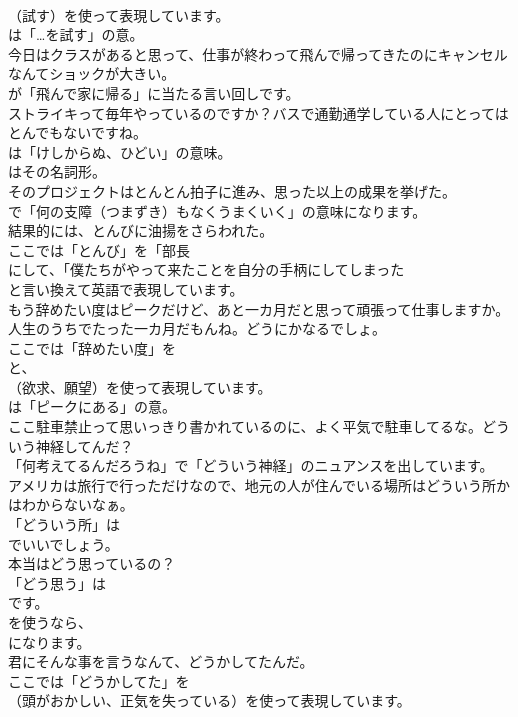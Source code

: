 \documentclass[8pt]{extreport}
\begin{document}
\begin{CJK}{UTF8}{min}
\\	（試す）を使って表現しています。
\\	は「…を試す」の意。	
\\	今日はクラスがあると思って、仕事が終わって飛んで帰ってきたのにキャンセルなんてショックが大きい。 
\\	が「飛んで家に帰る」に当たる言い回しです。	
\\	ストライキって毎年やっているのですか？バスで通勤通学している人にとってはとんでもないですね。 
\\	は「けしからぬ、ひどい」の意味。
\\	はその名詞形。	
\\	そのプロジェクトはとんとん拍子に進み、思った以上の成果を挙げた。 
\\	で「何の支障（つまずき）もなくうまくいく」の意味になります。	
\\	結果的には、とんびに油揚をさらわれた。 
\\	ここでは「とんび」を「部長
\\	にして、「僕たちがやって来たことを自分の手柄にしてしまった
\\	と言い換えて英語で表現しています。	
\\	もう辞めたい度はピークだけど、あと一カ月だと思って頑張って仕事しますか。人生のうちでたった一カ月だもんね。どうにかなるでしょ。 
\\	ここでは「辞めたい度」を 
\\	と、
\\	（欲求、願望）を使って表現しています。
\\	は「ピークにある」の意。	
\\	ここ駐車禁止って思いっきり書かれているのに、よく平気で駐車してるな。どういう神経してんだ？ 
\\	「何考えてるんだろうね」で「どういう神経」のニュアンスを出しています。	
\\	アメリカは旅行で行っただけなので、地元の人が住んでいる場所はどういう所かはわからないなぁ。 
\\	「どういう所」は 
\\	でいいでしょう。	
\\	本当はどう思っているの？ 
\\	「どう思う」は
\\	です。
\\	を使うなら、
\\	になります。	
\\	君にそんな事を言うなんて、どうかしてたんだ。 
\\	ここでは「どうかしてた」を
\\	（頭がおかしい、正気を失っている）を使って表現しています。	

\end{CJK}
\end{document}
